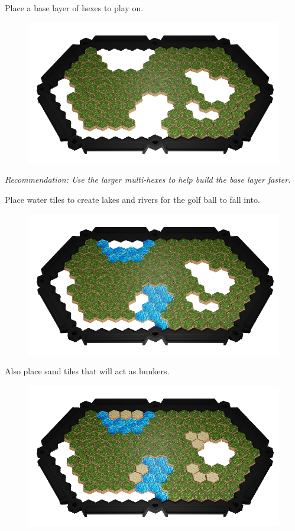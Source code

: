 \documentclass[../main.tex]{subfiles}
\begin{document}
Place a base layer of hexes to play on. 

\begin{figure}[h]
    \centering
    \includegraphics[width=1\linewidth]{chapters//boardsetup/Source Golf Base Layer.png}
\end{figure}

\textit{Recommendation: Use the larger multi-hexes to help build the base layer faster.}


Place water tiles to create lakes and rivers for the golf ball to fall into. 
\begin{figure}[h]
    \centering
    \includegraphics[width=1\linewidth]{chapters//boardsetup/Source Golf Base Layer Plus Water.png}
\end{figure}

Also place sand tiles that will act as bunkers.
\begin{figure}[h]
    \centering
    \includegraphics[width=1\linewidth]{chapters//boardsetup/Source Golf Base Layer.Water.SandTraps.png}
\end{figure}
\end{document}
